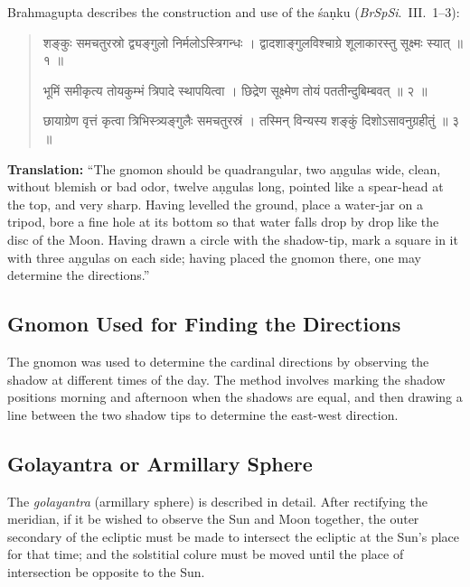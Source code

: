 \documentclass[11pt,a4paper]{article}
\newcommand{\dev}[1]{{\devanagarifont #1}}
\newenvironment{sanskritverse}{%
  \begin{quote}
  \devanagarifont
  \small
  \color{titlecolor}
}{\end{quote}}
\theoremstyle{definition}
\begin{document}
Brahmagupta describes the construction and use of the \'sa\d{n}ku (\textit{BrSpSi}.\ III.\ 1--3):

\begin{sanskritverse}
\dev{शङ्कुः समचतुरस्रो द्व्यङ्गुलो निर्मलोऽस्त्रिगन्धः ।}
\dev{द्वादशाङ्गुलविश्चाग्रे शूलाकारस्तु सूक्ष्मः स्यात् ॥ १ ॥}

\dev{भूमिं समीकृत्य तोयकुम्भं त्रिपादे स्थापयित्वा ।}
\dev{छिद्रेण सूक्ष्मेण तोयं पततीन्दुबिम्बवत् ॥ २ ॥}

\dev{छायाग्रेण वृत्तं कृत्वा त्रिभिस्त्र्यङ्गुलैः समचतुरस्रं ।}
\dev{तस्मिन् विन्यस्य शङ्कुं दिशोऽसावनुग्रहीतुं ॥ ३ ॥}
\end{sanskritverse}

\textbf{Translation:} ``The gnomon should be quadrangular, two a\d{n}gulas wide, clean, without blemish or bad odor, twelve a\d{n}gulas long, pointed like a spear-head at the top, and very sharp. Having levelled the ground, place a water-jar on a tripod, bore a fine hole at its bottom so that water falls drop by drop like the disc of the Moon. Having drawn a circle with the shadow-tip, mark a square in it with three a\d{n}gulas on each side; having placed the gnomon there, one may determine the directions.''

\vspace{0.3cm}

\subsection{Gnomon Used for Finding the Directions}

The gnomon was used to determine the cardinal directions by observing the shadow at different times of the day. The method involves marking the shadow positions morning and afternoon when the shadows are equal, and then drawing a line between the two shadow tips to determine the east-west direction.

\subsection{Golayantra or Armillary Sphere}

The \textit{golayantra} (armillary sphere) is described in detail. After rectifying the meridian, if it be wished to observe the Sun and Moon together, the outer secondary of the ecliptic must be made to intersect the ecliptic at the Sun's place for that time; and the solstitial colure must be moved until the place of intersection be opposite to the Sun.
\end{document}
